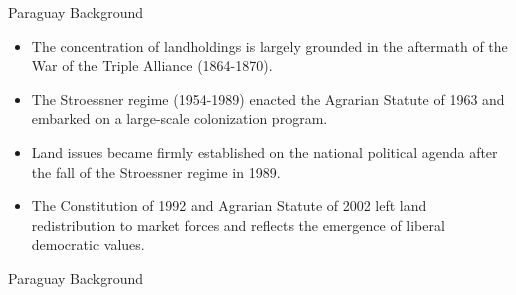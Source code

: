 \documentclass[xcolor=dvipsnames]{beamer}
\begin{document}
\begin{frame}{Paraguay Background}
\begin{itemize}
\item The concentration of landholdings is largely grounded in the aftermath 
of the War of the Triple Alliance (1864-1870).
\par\pause\noindent \item The Stroessner regime (1954-1989) enacted the 
Agrarian Statute of 1963 and embarked on a large-scale colonization program.
\par\pause\noindent \item Land issues became firmly established on the 
national political agenda after the fall of the Stroessner regime in 1989.
\par\pause\noindent \item The Constitution of 1992 and Agrarian Statute 
of 2002 left land redistribution to market forces and reflects the emergence 
of liberal democratic values.
\end{itemize}
\end{frame}

\begin{frame}{Paraguay Background}
\footnotesize
{}
\end{frame}
\end{document}
